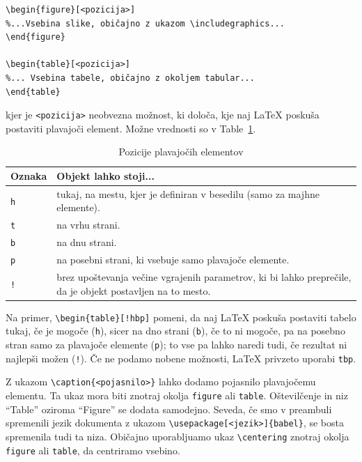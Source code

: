 \begin{verbatim}
\begin{figure}[<pozicija>]
%...Vsebina slike, običajno z ukazom \includegraphics...
\end{figure}

\begin{table}[<pozicija>]
%... Vsebina tabele, običajno z okoljem tabular...
\end{table}
\end{verbatim}

kjer je \texttt{\textless pozicija\textgreater } neobvezna možnost, ki določa, kje naj LaTeX poskuša postaviti plavajoči element.
Možne vrednosti so v Table~\ref{tab-floating-positions}.

\begin{table}
\centering
\caption[]{Pozicije plavajočih elementov}
\label{tab-floating-positions}
\begin{tabular}{p{}p{}}
\toprule
Oznaka & Objekt lahko stoji... \\
\hline
\texttt{h} & tukaj, na mestu, kjer je definiran v besedilu (samo za majhne elemente). \\
\texttt{t} & na vrhu strani. \\
\texttt{b} & na dnu strani. \\
\texttt{p} & na posebni strani, ki vsebuje samo plavajoče elemente. \\
\texttt{!} & brez upoštevanja večine vgrajenih parametrov, ki bi lahko preprečile, da je objekt postavljen na to mesto. \\
\bottomrule
\end{tabular}
\end{table}

Na primer, \texttt{{\textbackslash}begin\{table\}[!hbp]} pomeni, da naj LaTeX poskuša postaviti tabelo tukaj, če je mogoče (\texttt{h}), sicer na dno strani (\texttt{b}), če to ni mogoče, pa na posebno stran samo za plavajoče elemente (\texttt{p}); to vse pa lahko naredi tudi, če rezultat ni najlepši možen (\texttt{!}).
Če ne podamo nobene možnosti, LaTeX privzeto uporabi \texttt{tbp}.

Z ukazom \texttt{{\textbackslash}caption\{\textless pojasnilo\textgreater \}} lahko dodamo pojasnilo plavajočemu elementu.
Ta ukaz mora biti znotraj okolja \texttt{figure} ali \texttt{table}.
Oštevilčenje in niz ``Table'' oziroma ``Figure'' se dodata samodejno.
Seveda, če smo v preambuli spremenili jezik dokumenta z ukazom \texttt{{\textbackslash}usepackage[\textless jezik\textgreater ]\{babel\}}, se bosta spremenila tudi ta niza.
Običajno uporabljuamo ukaz \texttt{{\textbackslash}centering} znotraj okolja \texttt{figure} ali \texttt{table}, da centriramo vsebino.


